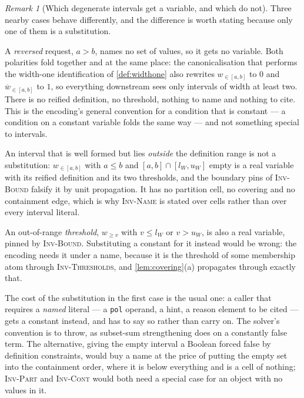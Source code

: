 \documentclass[11pt,a4paper]{article}
\theoremstyle{plain}
\theoremstyle{definition}
\theoremstyle{remark}
\newtheorem{remarkN}{Remark}
\newcommand{\atge}[2]{#1_{\geq #2}}
\newcommand{\atin}[3]{#1_{\in[#2,#3]}}
\newcommand{\natin}[3]{\overline{#1}_{\in[#2,#3]}}
\newcommand{\inv}[1]{\textnormal{\textsc{Inv-#1}}}
\newcommand{\code}[1]{\texttt{#1}}
\newcommand{\invThresholds}{\inv{Thresholds}}
\newcommand{\invPart}{\inv{Part}}
\newcommand{\invCont}{\inv{Cont}}
\newcommand{\invName}{\inv{Name}}
\begin{document}
\begin{remarkN}[Which degenerate intervals get a variable, and which do not]
\label{rem:degenerate}
Three nearby cases behave differently, and the difference is worth stating
because only one of them is a substitution.

A \emph{reversed} request, $a>b$, names no set of values, so it gets no
variable.  Both polarities fold together and at the same place: the
canonicalisation that performs the width-one identification of
\cref{def:widthone} also rewrites $\atin{w}{a}{b}$ to $0$ and $\natin{w}{a}{b}$
to $1$, so everything downstream sees only intervals of width at least two.
There is no reified definition, no threshold, nothing to name and nothing to cite.
This is the encoding's general convention for a condition that is constant ---
a condition on a constant variable folds the same way --- and not something
special to intervals.

An interval that is well formed but lies \emph{outside} the definition range is
not a substitution: $\atin{w}{a}{b}$ with $a\leq b$ and $[a,b]\cap[l_W,u_W]$
empty is a real variable with its reified definition and its two thresholds, and the
boundary pins of \inv{Bound} falsify it by unit propagation.  It has no
partition cell, no covering and no containment edge, which is why \invName{} is
stated over cells rather than over every interval literal.

An out-of-range \emph{threshold}, $\atge{w}{v}$ with $v\leq l_W$ or $v>u_W$, is also a
real variable, pinned by \inv{Bound}.  Substituting a constant for it instead
would be wrong: the encoding needs it under a name, because it is the threshold of
some membership atom through \invThresholds{}, and \cref{lem:covering}(a) propagates
through exactly that.

The cost of the substitution in the first case is the usual one: a caller that
requires a \emph{named} literal --- a \code{pol} operand, a hint, a reason
element to be cited --- gets a constant instead, and has to say so rather than
carry on.  The solver's convention is to throw, as subset-sum strengthening
does on a constantly false term.  The alternative, giving the empty interval a
Boolean forced false by definition constraints, would buy a name at the price of
putting the empty set into the containment order, where it is below everything
and is a cell of nothing; \invPart{} and \invCont{} would both need a special
case for an object with no values in it.
\end{remarkN}
\end{document}
